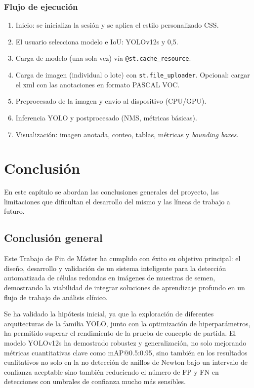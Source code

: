 \documentclass[12pt,a4paper,onecolumn,oneside]{report}
\begin{document}
\subsection{Flujo de ejecución}
\begin{enumerate}
  \item Inicio: se inicializa la sesión y se aplica el estilo personalizado CSS.
  \item El usuario selecciona modelo e IoU: YOLOv12s y 0,5.
  \item Carga de modelo (una sola vez) vía \texttt{@st.cache\_resource}.
  \item Carga de imagen (individual o lote) con \texttt{st.file\_uploader}. Opcional: cargar el xml con las anotaciones en formato PASCAL VOC.
  \item Preprocesado de la imagen y envío al dispositivo (CPU/GPU).
  \item Inferencia YOLO y postprocesado (NMS, métricas básicas).
  \item Visualización: imagen anotada, conteo, tablas, métricas y \textit{bounding boxes}.
\end{enumerate}


\chapter{Conclusión} %

En este capítulo se abordan las conclusiones generales del proyecto, las limitaciones que dificultan el desarrollo del mismo y las líneas de trabajo a futuro.

\section{Conclusión general}
\label{sec:Conclusión general}

Este Trabajo de Fin de Máster ha cumplido con éxito su objetivo principal: el diseño, desarrollo y validación de un sistema inteligente para la detección automatizada de células redondas en imágenes de muestras de semen, demostrando 
la viabilidad de integrar soluciones de aprendizaje profundo en un flujo de trabajo de análisis clínico.

Se ha validado la hipótesis inicial, ya que la exploración de diferentes arquitecturas de la familia YOLO, junto con la optimización de hiperparámetros, ha permitido superar el rendimiento de la prueba de concepto de partida. 
El modelo YOLOv12s ha demostrado robustez y generalización, no solo mejorando métricas cuantitativas clave como mAP@0.5:0.95, sino también en los resultados cualitativos no solo en la no detección de anillos de Newton bajo un intervalo de confianza aceptable sino también
reduciendo el número de FP y FN en detecciones con umbrales de confianza mucho más sensibles.  
\end{document}
